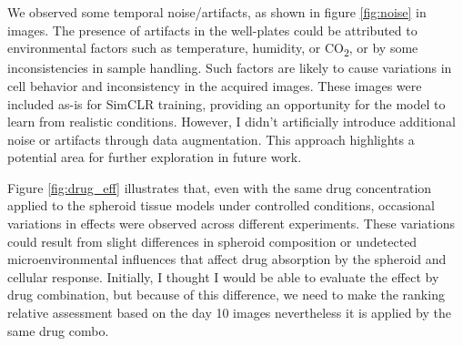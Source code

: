 We observed some temporal noise/artifacts, as shown in figure  \ref{fig:noise} in images. The presence of artifacts in the well-plates could be attributed to environmental factors such
as temperature, humidity, or CO\textsubscript{2}, or by some inconsistencies in sample handling. Such factors are likely to cause variations in cell behavior and
inconsistency in the  acquired images. These images were included as-is for SimCLR training, providing an opportunity for the model to learn from realistic conditions. 
However, I didn't artificially introduce additional noise or artifacts through data augmentation. This approach highlights a potential area for further exploration in future work. 

Figure \ref{fig:drug_eff} illustrates that, even with the same drug concentration applied to the spheroid tissue models under controlled conditions, occasional variations in 
effects were observed across different experiments. These variations could result from slight differences in spheroid composition or undetected microenvironmental influences 
that affect drug absorption by the spheroid and cellular response. Initially, I thought I would be able to evaluate the effect by drug combination, but because of this 
difference, we need to make the ranking relative assessment based on the day 10 images nevertheless it is applied by the same drug combo.


